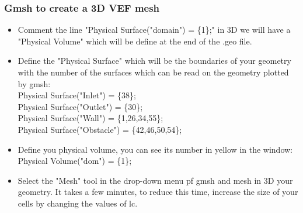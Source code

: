 \documentclass[10pt]{beamer}
\begin{document}
\begin{frame}
\frametitle{Gmsh to create a 3D VEF mesh}
\begin{block}{}

\begin{itemize}
\item Comment the line "Physical Surface("domain") = \{1\};" in 3D we will have a "Physical Volume" which will be define at the end of the .geo file.
\item Define the "Physical Surface" which will be the boundaries of your geometry with the number of the surfaces which can be read on the geometry plotted by gmsh:\\
Physical Surface("Inlet") = \{38\};\\
Physical Surface("Outlet") = \{30\};\\
Physical Surface("Wall") = \{1,26,34,55\};\\
Physical Surface("Obstacle") = \{42,46,50,54\};\\
\item Define you physical volume, you can see its number in yellow in the window:\\
Physical Volume("dom") = \{1\};


\item Select the "Mesh" tool in the drop-down menu pf gmsh and mesh in 3D your geometry. It takes a few minutes, to reduce this time, increase the size of your cells by changing the values of lc.
\end{itemize}

\end{block}
\end{frame}
\end{document}
